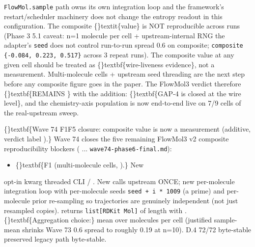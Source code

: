 \documentclass{article}
\begin{document}
\texttt{FlowMol.sample} path owns its own integration loop and the framework's restart/scheduler machinery does not change the entropy readout in this configuration. The composite \{\}textit\{value\} is NOT reproducible across runs (Phase 3 5.1 caveat: n=1 molecule per cell + upstream-internal RNG the adapter's \texttt{seed} does not control  run-to-run spread 0.6 on composite; \texttt{composite  \{-0.084, 0.223, 0.517\}} across 3 repeat runs). The composite value at any given cell should be treated as \{\}textbf\{wire-liveness evidence\}, not a measurement. Multi-molecule cells + upstream seed threading are the next step before any composite figure goes in the paper. The FlowMol3 verdict therefore \{\}textbf\{REMAINS \} with the addition: \{\}textbf\{GAP-4 is closed at the wire level\}, and the chemistry-axis population is now end-to-end live on 7/9 cells of the real-upstream sweep.

\{\}textbf\{Wave 74 F1F5 closure: composite value is now a measurement (additive, verdict label ).\} Wave 74 closes the five remaining FlowMol3 v2 composite reproducibility blockers ( ... \texttt{wave74-phase6-final.md}):

\begin{itemize}
\item \{\}textbf\{F1 (multi-molecule cells, ).\} New
\end{itemize}
opt-in kwarg  threaded CLI     /   . New  calls upstream  ONCE; new  per-molecule integration loop with per-molecule seeds \texttt{seed + i * 1009} (a prime) and per-molecule prior re-sampling so trajectories are genuinely independent (not just resampled copies).  returns \texttt{list[RDKit Mol]} of length  with . \{\}textbf\{Aggregation choice:\} mean over molecules per cell (justified  sample-mean shrinks Wave 73 0.6 spread to roughly 0.19 at n=10). D.4 72/72 byte-stable preserved   legacy path byte-stable.
\end{document}
